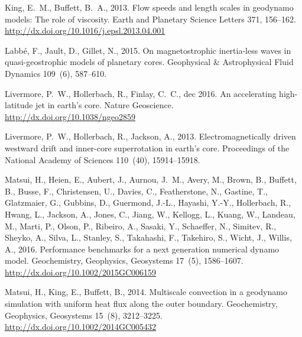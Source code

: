 \documentclass[12pt, a4paper]{article}
\begin{document}
\begin{thebibliography}{73}
King, E.~M., Buffett, B.~A., 2013. Flow speeds and length scales in geodynamo
  models: The role of viscosity. Earth and Planetary Science Letters 371,
  156--162.
\newline\urlprefix\url{http://dx.doi.org/10.1016/j.epsl.2013.04.001}

Labb{\'e}, F., Jault, D., Gillet, N., 2015. On magnetostrophic inertia-less
  waves in quasi-geostrophic models of planetary cores. Geophysical \&
  Astrophysical Fluid Dynamics 109~(6), 587--610.

Livermore, P.~W., Hollerbach, R., Finlay, C.~C., dec 2016. An accelerating
  high-latitude jet in earth's core. Nature Geoscience.
\newline\urlprefix\url{http://dx.doi.org/10.1038/ngeo2859}

Livermore, P.~W., Hollerbach, R., Jackson, A., 2013. Electromagnetically driven
  westward drift and inner-core superrotation in earth's core. Proceedings of
  the National Academy of Sciences 110~(40), 15914--15918.

Matsui, H., Heien, E., Aubert, J., Aurnou, J.~M., Avery, M., Brown, B.,
  Buffett, B., Busse, F., Christensen, U., Davies, C., Featherstone, N.,
  Gastine, T., Glatzmaier, G., Gubbins, D., Guermond, J.-L., Hayashi, Y.-Y.,
  Hollerbach, R., Hwang, L., Jackson, A., Jones, C., Jiang, W., Kellogg, L.,
  Kuang, W., Landeau, M., Marti, P., Olson, P., Ribeiro, A., Sasaki, Y.,
  Schaeffer, N., Simitev, R., Sheyko, A., Silva, L., Stanley, S., Takahashi,
  F., Takehiro, S., Wicht, J., Willis, A., 2016. Performance benchmarks for a
  next generation numerical dynamo model. Geochemistry, Geophysics, Geosystems
  17~(5), 1586--1607.
\newline\urlprefix\url{http://dx.doi.org/10.1002/2015GC006159}

Matsui, H., King, E., Buffett, B., 2014. Multiscale convection in a geodynamo
  simulation with uniform heat flux along the outer boundary. Geochemistry,
  Geophysics, Geosystems 15~(8), 3212--3225.
\newline\urlprefix\url{http://dx.doi.org/10.1002/2014GC005432}


\end{thebibliography}
\end{document}
